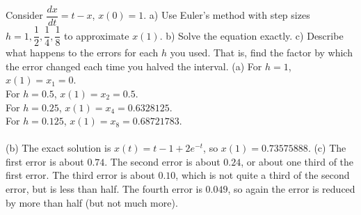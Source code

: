 {Consider $\dfrac{dx}{dt} = t-x$, $x(0)=1$.  a) Use Euler's method
with step sizes $h = 1, \dfrac{1}{2}, \dfrac{1}{4}, \dfrac{1}{8}$ to
approximate
$x(1)$.  b) Solve the equation exactly.
c) Describe what happens to the
errors for each $h$ you used.  That is, find the factor by which the error
changed each time you halved the interval.}
{(a) For $h=1$, $x(1) = x_1 = 0$.\\
For $h=0.5$, $x(1) = x_2 = 0.5$.\\
For $h=0.25$, $x(1) = x_4 = 0.6328125$.\\
For $h=0.125$, $x(1) = x_8 = 0.68721783$.\\
\\
(b) The exact solution is $x(t) = t-1+2e^{-t}$, so $x(1) = 0.73575888$.
(c) The first error is about $0.74$. The second error is about $0.24$, or about one third of the first error. The third error is about $0.10$, which is not quite a third of the second error, but is less than half. The fourth error is $0.049$, so again the error is reduced by more than half (but not much more).}